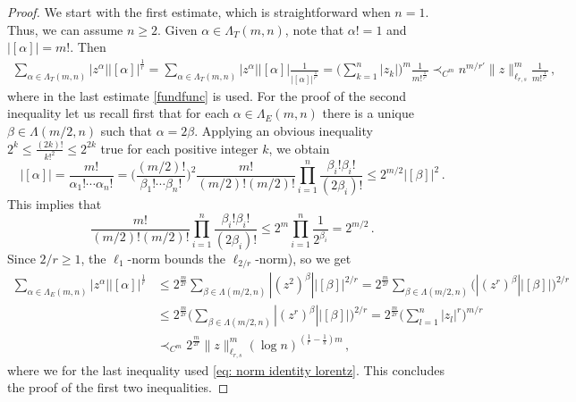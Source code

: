 \documentclass[10pt,a4paper]{amsart}
\newcommand{\dis}{\displaystyle}
\begin{document}
\begin{proof}
We start with the first estimate, which is straightforward when $n=1$. Thus, we can assume $n \geq 2$. Given $\alpha \in \Lambda_T(m,n)$,
note that $\alpha !=1$ and $|[\alpha]|= m!$. Then
\begin{align*}
\sum_{\alpha \in \Lambda_T(m,n)} |z^\alpha| |[\alpha]|^{\frac{1}{r}}
= \sum_{\alpha \in \Lambda_T(m,n)} | z^\alpha| |[\alpha]| \frac{1}{|[\alpha]|^{\frac{1}{r'}}}
= \Big( \sum_{k=1}^n |z_k| \Big)^{m} \frac{1}{m!^{\frac{1}{r'}}}
\prec_{C^m} n^{m/r'} \| z \|_{\ell_{r,s}}^m \frac{1}{m!^{\frac{1}{r'}}}\,,
\end{align*}
where in the last estimate \eqref{fundfunc} is used. For the proof of the second inequality let us recall first that
for each $\alpha \in \Lambda_E(m,n)$ there is a unique $\beta \in {\Lambda}(m/2,n)$
such that $\alpha = 2 \beta$. Applying an obvious inequality $2^k \le \frac{(2k)!}{k!^2} \le 2^{2k}$ true for each positive integer
$k$, we obtain
\[
|[\alpha]| = \frac{m!}{\alpha_1 ! \cdots \alpha_n!} = \Big(\frac{(m/2)!}{\beta_1 ! \cdots \beta_n!}\Big)^2 \frac{m!}{(m/2)!(m/2)!} \prod_{i=1}^n \frac{\beta_i! \beta_i!}{(2\beta_i)!} \le 2^{m/2}|[\beta]|^2\,.
\]
This implies that
\[
\frac{m!}{(m/2)!(m/2)!} \prod_{i=1}^n \frac{\beta_i! \beta_i!}{(2\beta_i)!} \le 2^m \prod_{i=1}^n \frac{1}{2^{\beta_i}} = 2^{m/2}\,.
\]
Since $2/r \ge 1$, the $\ell_1$-norm bounds the $\ell_{2/r}$-norm), so we get
\begin{align*}
\sum_{\alpha \in \Lambda_E(m,n)} |z^\alpha| |[\alpha]|^{\frac{1}{r}}
&
\le \dis 2^{\frac{m}{2r}}\sum_{\beta \in {\Lambda}(m/2,n)} |(z^2)^\beta| |[\beta]|^{2/r}
= 2^{\frac{m}{2r}} \dis\sum_{\beta \in {\Lambda}(m/2,n)} \Big( |(z^r)^\beta| |[\beta]| \Big)^{2/r}
\\&
\le 2^{\frac{m}{2r}}\Big( \dis\sum_{\beta \in {\Lambda}(m/2,n)} |(z^r)^\beta| |[\beta]| \Big)^{2/r}
=  2^{\frac{m}{2r}}\Big( \sum_{l=1}^n |z_l|^r \Big)^{m/r}
\\&
\prec_{C^m} 2^{\frac{m}{2r}}\|z\|_{\ell_{r,s}}^m (\log n)^{(\frac{1}{r}-\frac{1}{s})m}\,,
\end{align*}
where we for the last inequality used \eqref{eq: norm identity lorentz}. This concludes the proof of the first two inequalities.


\end{proof}
\end{document}
